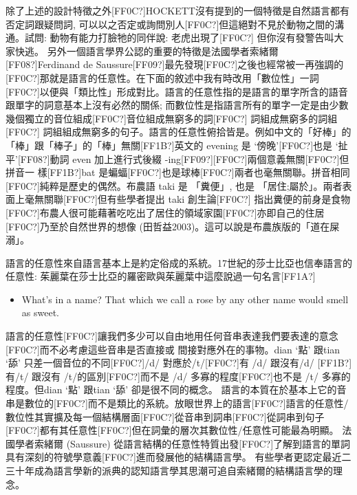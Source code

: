 除了上述的設計特徵之外[FF0C?]HOCKETT沒有提到的一個特徵是自然語言都有否定詞跟疑問詞, 可以以之否定或詢問別人[FF0C?]但這絕對不見於動物之間的溝通。試問: 動物有能力打臉牠的同伴說: 老虎出現了[FF0C?] 但你沒有發警告叫大家快逃。 另外一個語言學界公認的重要的特徵是法國學者索緒爾[FF08?]Ferdinand de Saussure[FF09?]最先發現[FF0C?]之後也經常被一再強調的[FF0C?]那就是語言的任意性。在下面的敘述中我有時改用「數位性」一詞[FF0C?]以便與「類比性」形成對比。語言的任意性指的是語言的單字所含的語音跟單字的詞意基本上沒有必然的關係; 而數位性是指語言所有的單字一定是由少數幾個獨立的音位組成[FF0C?]音位組成無窮多的詞[FF0C?] 詞組成無窮多的詞組[FF0C?] 詞組組成無窮多的句子。語言的任意性俯拾皆是。例如中文的「好棒」的「棒」跟「棒子」的「棒」無關[FF1B?]英文的 evening 是 ‘傍晚’[FF0C?]也是 ‘扯平’[FF08?]動詞 even 加上進行式後綴 -ing[FF09?][FF0C?]兩個意義無關[FF0C?]但拼音一 樣[FF1B?]bat 是蝙蝠[FF0C?]也是球棒[FF0C?]兩者也毫無關聯。拼音相同[FF0C?]純粹是歷史的偶然。布農語 taki 是 「糞便」, 也是 「居住;屬於」。兩者表面上毫無關聯[FF0C?]但有些學者提出 taki 創生論[FF0C?] 指出糞便的前身是食物[FF0C?]布農人很可能藉著吃吃出了居住的領域家園[FF0C?]亦即自己的住居[FF0C?]乃至於自然世界的想像 (田哲益2003)。這可以說是布農族版的「道在屎溺」。

語言的任意性來自語言基本上是約定俗成的系統。17世紀的莎士比亞也信奉語言的任意性: 茱麗葉在莎士比亞的羅密歐與茱麗葉中這麼說過一句名言[FF1A?]

\begin{itemize}
\item What’s in a name? That which we call a rose by any other name would                           smell as sweet.  

\end{itemize}

語言的任意性[FF0C?]讓我們多少可以自由地用任何音串表達我們要表達的意念[FF0C?]而不必考慮這些音串是否直接或 間接對應外在的事物。dian ‘點’ 跟tian ‘舔’  只差一個音位的不同[FF0C?]/d/  對應於/t/[FF0C?]有 /d/  跟沒有/d/ [FF1B?]有/t/  跟沒有  /t/的區別[FF0C?]而不是  /d/  多寡的程度[FF0C?]也不是 /t/ 多寡的程度。但dian ‘點’ 跟tian ‘舔’  卻是很不同的概念。  語言的本質在於基本上它的音串是數位的[FF0C?]而不是類比的系統。放眼世界上的語言[FF0C?]語言的任意性/數位性其實擴及每一個結構層面[FF0C?]從音串到詞串[FF0C?]從詞串到句子[FF0C?]都有其任意性[FF0C?]但在詞彙的層次其數位性/任意性可能最為明顯。 法國學者索緒爾 (Saussure) 從語言結構的任意性特質出發[FF0C?]了解到語言的單詞具有深刻的符號學意義[FF0C?]進而發展他的結構語言學。 有些學者更認定最近二三十年成為語言學新的派典的認知語言學其思潮可追自索緒爾的結構語言學的理念。

